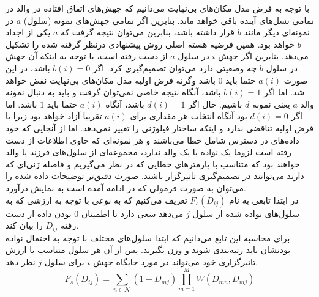 با توجه به فرض مدل مکان‌های بی‌نهایت می‌دانیم که جهش‌های اتفاق افتاده در والد در تمامی نسل‌های آینده باقی خواهد ماند. بنابرین اگر تمامی جهش‌های نمونه (سلول) $a$ در نمونه‌ای دیگر مانند $b$ قرار داشته باشد، بنابرین می‌توان نتیجه گرفت که $a$ یکی از اجداد $b$ خواهد بود. همین فرضیه هسته اصلی روش پیشنهادی درنظر گرفته شده را تشکیل می‌دهد. بنابرین اگر جهش $i$ در سلول $a$ از دست رفته است، با توجه به اینکه آن جهش در سلول $b$ چه وضعیتی دارد می‌توان تصمیم‌گیری کرد. اگر $b(i)=0$ باشد، در این صورت $a(i)$ حتما باید $0$ باشد وگرنه فرض اولیه مدل مکان‌های بی‌نهایت نقض خواهد شد. اما اگر $b(i)=1$ باشد، آنگاه نتیجه خاصی نمی‌توان گرفت و باید به دنبال نمونه والد $a$ یعنی نمونه $d$ باشیم. حال اگر $d(i)=1$ باشد، آنگاه $a(i)$ حتما باید $1$ باشد. اما اگر $d(i)=0$ بود آنگاه انتخاب هر مقداری برای $a(i)$ تقریبا آزاد خواهد بود زیرا با فرض اولیه تناقضی ندارد و اینکه ساختار فیلوژنی را تغییر نمی‌دهد. اما از آنجایی که  خود داده‌های در دسترس شامل خطا می‌باشند و هر نمونه‌ای که حاوی اطلاعات از دست رفته است لزوما یک نواده یا یک والد ندارد، مجموعه‌ای از سلول‌های فرزند یا والد خواهند بود که متناسب با پارمترهای خطایی که در نظر می‌گیریم و فاصله ژنی‌ای که دارند می‌توانند در تصمیم‌گیری تاثیرگزار باشند. صورت دقیق‌تر توضیحات داده شده را می‌توان به صورت فرمولی که در ادامه آمده است به نمایش درآورد.
\\
در ابتدا تابعی به نام $F_s(D_{ij})$ تعریف می‌کنیم که به نوعی با توجه به ارزشی که به سلول‌های نواده شده از سلول $j$ می‌دهد سعی دارد تا اطمینان $0$ بودن داده از دست رفته $D_{ij}$ را بیان کند.
\\
برای محاسبه این تابع می‌دانیم که ابتدا سلول‌های مختلف با توجه به احتمال نواده بودنشان باید رتبه‌بندی شوند و وزن بگیرند. پس از آن  هر سلول متناسب با ارزش تاثیرگزاری خود می‌تواند در مورد جایگاه جهش $i$ برای سلول $j$ نظر دهد.
\begin{equation}
	F_s(D_{ij}) = \sum_{n \in \mathcal{N}}  (1-D_{mj})  \prod_{m=1}^{M} W(D_{mn}, D_{mj})
	\label{eq:ch_pm:F_s_simple}
\end{equation}

